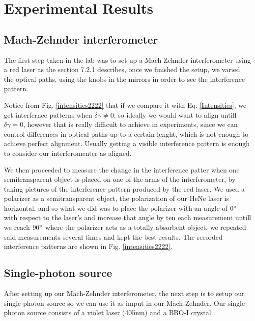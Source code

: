 \documentclass[12pt]{book}
\newcommand\blankpage{
    \null
    \thispagestyle{empty}
    \addtocounter{page}{0}
    \newpage
    }
\begin{document}
 \pagebreak
 \blankpage

\chapter{Experimental Results}

\section{Mach-Zehnder interferometer}

The first step taken in the lab was to set up a Mach-Zehnder interferometer using a red laser as the section 7.2.1 describes, once we finished the setup, we varied the optical paths, using the knobs in the mirrors in order to see the interference pattern.

Notice from Fig. \ref{intensities2222} that if we compare it with Eq. \ref{Intensities}, we get interfernce patterns when $\delta \gamma \neq 0$, so ideally we would want to align untill $\delta \gamma=0$, however that is really difficult to achieve in experiments, since we can control differences in optical paths up to a certain lenght, which is not enough to achieve perfect alignment. Usually getting a visible interference pattern is enough to consider our interferomenter as aligned. 

We then proceeded to measure the change in the interference patter when one semitransparent object is placed on one of the arms of the interferometer, by taking pictures of the interference pattern produced by the red laser. We used a polarizer as a semitransparent object, the polarization of our HeNe laser is horizontal, and so what we did was to place the polarizer with an angle of $0\degree$ with respect to the laser's and increase that angle by ten each measurement untill we reach $90\degree$ where the polarizer acts as a totally absorbent object, we repeated said measurements several times and kept the best results. The recorded interference patterns are shown in Fig. \ref{intensities2222}.

\section{Single-photon source}

After setting up our Mach-Zehnder interferometer, the next step is to setup our  single photon source so we can use it as imput in our Mach-Zehnder. Our single photon source consists of a violet laser (405nm) and a BBO-I crystal.
\end{document}
